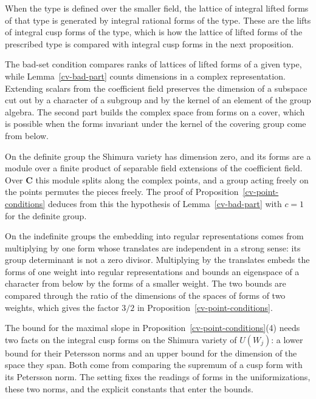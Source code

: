 When the type is defined over the smaller field, the lattice of integral lifted forms of that type
is generated by integral rational forms of the type. These are the lifts of integral cusp forms of
the type, which is how the lattice of lifted forms of the prescribed type is compared with integral
cusp forms in the next proposition.

The bad-set condition compares ranks of lattices of lifted forms of a given type, while
Lemma~\ref{cv-bad-part} counts dimensions in a complex representation. Extending scalars from the
coefficient field preserves the dimension of a subspace cut out by a character of a subgroup and by
the kernel of an element of the group algebra. The second part builds the complex space from forms
on a cover, which is possible when the forms invariant under the kernel of the covering group come
from below.

On the definite group the Shimura variety has dimension zero, and its forms are a module over a
finite product of separable field extensions of the coefficient field. Over $\mathbf C$ this module
splits along the complex points, and a group acting freely on the points permutes the pieces
freely. The proof of Proposition~\ref{cv-point-conditions} deduces from this the hypothesis of
Lemma~\ref{cv-bad-part} with $c=1$ for the definite group.

On the indefinite groups the embedding into regular representations comes from multiplying by one
form whose translates are independent in a strong sense: its group determinant is not a zero
divisor. Multiplying by the translates embeds the forms of one weight into regular representations
and bounds an eigenspace of a character from below by the forms of a smaller weight. The two bounds
are compared through the ratio of the dimensions of the spaces of forms of two weights, which gives
the factor $3/2$ in Proposition~\ref{cv-point-conditions}.

The bound for the maximal slope in Proposition~\ref{cv-point-conditions}(4) needs two facts on the
integral cusp forms on the Shimura variety of $U(W_j)$: a lower bound for their Petersson norms and an
upper bound for the dimension of the space they span. Both come from comparing the supremum of a
cusp form with its Petersson norm. The setting fixes the readings of forms in the uniformizations,
these two norms, and the explicit constants that enter the bounds.


